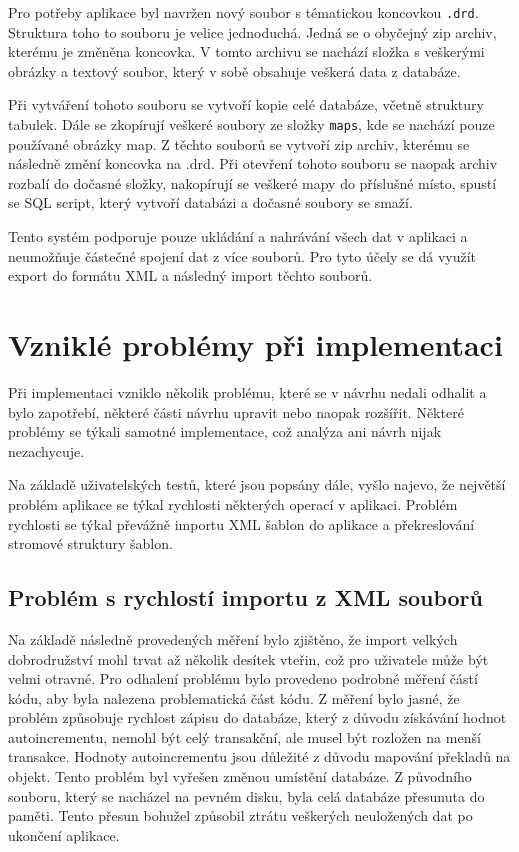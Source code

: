 \documentclass[thesis=B,czech]{resources/FITthesis}[2012/06/26]
\begin{document}
Pro potřeby aplikace byl navržen nový soubor s tématickou koncovkou \texttt{.drd}. Struktura toho to souboru je velice jednoduchá. Jedná se o obyčejný zip archiv, kterému je změněna koncovka. V tomto archivu se nachází složka s veškerými obrázky a textový soubor, který v sobě obsahuje veškerá data z databáze. \par

Při vytváření tohoto souboru se vytvoří kopie celé databáze, včetně struktury tabulek. Dále se zkopírují veškeré soubory ze složky \texttt{maps}, kde se nachází pouze používané obrázky map. Z těchto souborů se vytvoří zip archiv, kterému se následně změní koncovka na .drd. Při otevření tohoto souboru se naopak archiv rozbalí do dočasné složky, nakopírují se veškeré mapy do příslušné místo, spustí se SQL script, který vytvoří databázi a dočasné soubory se smaží. \par

Tento systém podporuje pouze ukládání a nahrávání všech dat v aplikaci a neumožňuje částečné spojení dat z více souborů. Pro tyto účely se dá využít export do formátu XML a následný import těchto souborů. 


\section{Vzniklé problémy při implementaci}
Při implementaci vzniklo několik problému, které se v návrhu nedali odhalit a bylo zapotřebí, některé části návrhu upravit nebo naopak rozšířit. Některé problémy se týkali samotné implementace, což analýza ani návrh nijak nezachycuje. \par 
Na základě uživatelských testů, které jsou popsány dále, vyšlo najevo, že největší problém aplikace se týkal rychlosti některých operací v aplikaci. Problém rychlosti se týkal převážně importu XML šablon do aplikace a překreslování stromové struktury šablon.
	\subsection{Problém s rychlostí importu z XML souborů}
Na základě následně provedených měření bylo zjištěno, že import velkých dobrodružství mohl trvat až několik desítek vteřin, což pro uživatele může být velmi otravné. Pro odhalení problému bylo provedeno podrobné měření částí kódu, aby byla nalezena problematická část kódu. Z měření bylo jasné, že problém způsobuje rychlost zápisu do databáze, který z důvodu získávání hodnot autoincrementu, nemohl být celý transakční, ale musel být rozložen na menší transakce. Hodnoty autoincrementu jsou důležité z důvodu mapování překladů na objekt. Tento problém byl vyřešen změnou umístění databáze. Z původního souboru, který se nacházel na pevném disku, byla celá databáze přesunuta do paměti. Tento přesun bohužel způsobil ztrátu veškerých neuložených dat po ukončení aplikace. \par 
\end{document}
